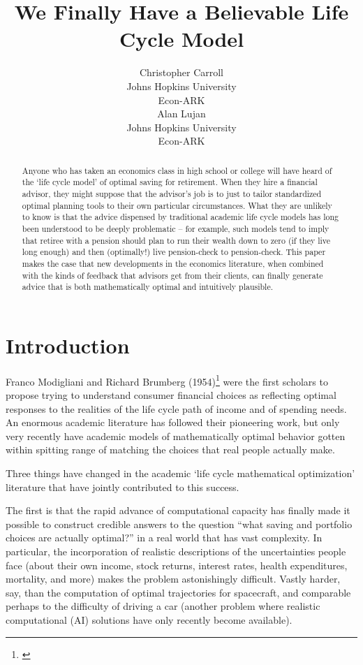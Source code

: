 \documentclass{article}
\title{We Finally Have a Believable Life Cycle Model}
\date{\displaydate{articleDate}}
\author{Christopher Carroll\footnotemark[1]\\
Johns Hopkins University\\Econ-ARK\\\AND
Alan Lujan\\
Johns Hopkins University\\Econ-ARK\\}
\begin{document}
\maketitle
{}

\begin{abstract}
Anyone who has taken an economics class in high school or college will have heard of the `life cycle model' of optimal saving for retirement. When they hire a financial advisor, they might suppose that the advisor's job is to just to tailor standardized optimal planning tools to their own particular circumstances. What they are unlikely to know is that the advice dispensed by traditional academic life cycle models has long been understood to be deeply problematic -- for example, such models tend to imply that retiree with a pension should plan to run their wealth down to zero (if they live long enough) and then (optimally!) live pension-check to pension-check. This paper makes the case that new developments in the economics literature, when combined with the kinds of feedback that advisors get from their clients, can finally generate advice that is both mathematically optimal and intuitively plausible.
\end{abstract}

\keywords{}

\section{Introduction}

Franco Modigliani and Richard Brumberg (1954)\footnote{\cite{2005}} were the first scholars to propose trying to understand consumer financial choices as reflecting optimal responses to the realities of the life cycle path of income and of spending needs. An enormous academic literature has followed their pioneering work, but only very recently have academic models of mathematically optimal behavior gotten within spitting range of matching the choices that real people actually make.

Three things have changed in the academic `life cycle mathematical optimization' literature that have jointly contributed to this success.

The first is that the rapid advance of computational capacity has finally made it possible to construct credible answers to the question ``what saving and portfolio choices are actually optimal?'' in a real world that has vast complexity. In particular, the incorporation of realistic descriptions of the uncertainties people face (about their own income, stock returns, interest rates, health expenditures, mortality, and more) makes the problem astonishingly difficult. Vastly harder, say, than the computation of optimal trajectories for spacecraft, and comparable perhaps to the difficulty of driving a car (another problem where realistic computational (AI) solutions have only recently become available).
\end{document}
